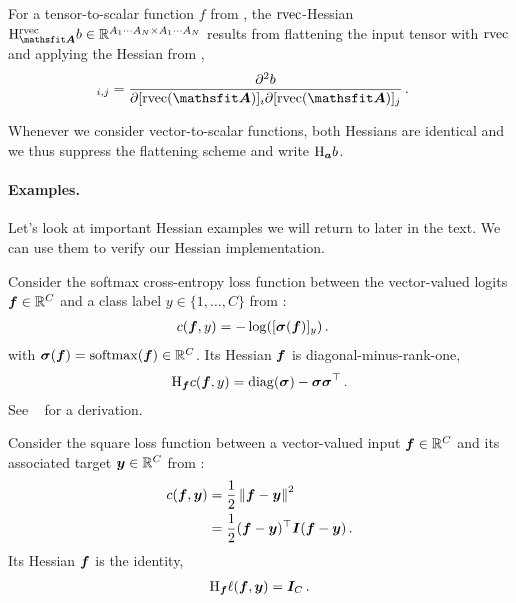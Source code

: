 \begin{definition}\label{def:rvec_hessian}
  For a tensor-to-scalar function $f$ from , the $\operatorname{rvec}$-Hessian $\hess_{\tA}^{\rvec}b \in \sR^{A_1 \cdots A_N \times A_1 \cdots A_N}$ results from flattening the input tensor with $\operatorname{rvec}$ and applying the Hessian from ,
  \begin{align*}
    [\hess^{\rvec}_{\tA}b]_{i, j}
     & =
    \frac{\partial^2 b}{\partial [\rvec(\tA)]_{i} \partial [\rvec(\tA)]_{j}}\,.
  \end{align*}
\end{definition}

Whenever we consider vector-to-scalar functions, both Hessians are identical and we thus suppress the flattening scheme and write $\mathrm{H}_{{\bm{a}}}b$.

\paragraph{Examples.}
Let's look at important Hessian examples we will return to later in the text.
We can use them to verify our Hessian implementation.

\switchcolumn[1]
\switchcolumn[0]

\begin{example}\label{ex:hessian-crossentropyloss}
  Consider the softmax cross-entropy loss function between the vector-valued logits ${\bm{f}} \in {\mathbb{R}}^C$ and a class label $y \in \{1, \dots, C\}$ from :
  \begin{align*}
    c({\bm{f}}, y)
     & =
    -\log([{\bm{\sigma}}({\bm{f}})]_y)\,.
  \end{align*}
  with ${\bm{\sigma}}({\bm{f}}) = \mathrm{softmax}({\bm{f}}) \in {\mathbb{R}}^C$.
  Its Hessian \wrt ${\bm{f}}$ is diagonal-minus-rank-one,
  \begin{align*}
    \mathrm{H}_{{\bm{f}}} c({\bm{f}}, y)
    =
    \operatorname{diag}({\bm{\sigma}}) - {\bm{\sigma}} {\bm{\sigma}}^\top\,.
  \end{align*}
  See \eg~\citet{dangel2020modular} for a derivation.
\end{example}

\switchcolumn[1]

\switchcolumn[0]
\begin{example}\label{ex:square_loss_hessian}
  Consider the square loss function between a vector-valued input ${\bm{f}} \in {\mathbb{R}}^C$ and its associated target ${\bm{y}} \in {\mathbb{R}}^C$ from :
  \begin{align*}
    c({\bm{f}}, {\bm{y}})
     & =
    \frac{1}{2}\left\lVert
    {\bm{f}} - {\bm{y}}
    \right\rVert^2
    \\
     & =
    \frac{1}{2}({\bm{f}} - {\bm{y}})^{\top} {\bm{I}} ({\bm{f}} - {\bm{y}})\,.
  \end{align*}
  Its Hessian \wrt ${\bm{f}}$ is the identity,
  \begin{align*}
    \mathrm{H}_{{\bm{f}}} \ell({\bm{f}}, {\bm{y}})
    =
    {\bm{I}}_C\,.
  \end{align*}
\end{example}

